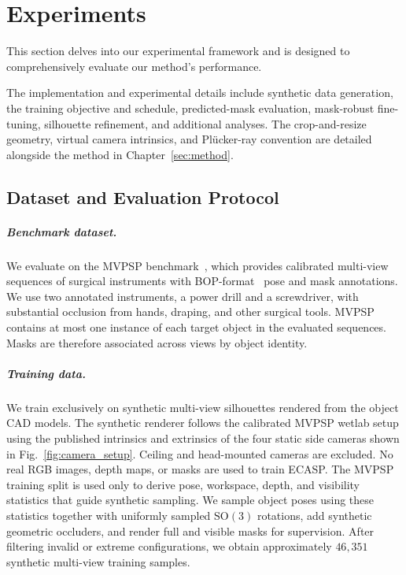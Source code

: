 \chapter{Experiments}
\label{sec:experiments}

This section delves into our experimental framework and is designed to comprehensively evaluate our method's performance.


The implementation and experimental details include synthetic data
generation, the training objective and schedule, predicted-mask evaluation,
mask-robust fine-tuning, silhouette refinement, and additional analyses.
The crop-and-resize geometry, virtual camera intrinsics, and Pl\"ucker-ray
convention are detailed alongside the method in Chapter~\ref{sec:method}.

\section{Dataset and Evaluation Protocol}
\label{sec:dataset}
\paragraph{Benchmark dataset.}
We evaluate on the MVPSP benchmark~\cite{hein2025surgicalnavigation}, which provides calibrated multi-view sequences of surgical instruments with BOP-format~\cite{hodan2018bop} pose and mask annotations.
We use two annotated instruments, a power drill and a screwdriver, with substantial occlusion from hands, draping, and other surgical tools.
MVPSP contains at most one instance of each target object in the evaluated
sequences. Masks are therefore associated across views by object identity.

\paragraph{Training data.}
We train exclusively on synthetic multi-view silhouettes rendered from the object CAD models.
The synthetic renderer follows the calibrated MVPSP wetlab setup using the published intrinsics and extrinsics of the four static side cameras shown in Fig.~\ref{fig:camera_setup}.
Ceiling and head-mounted cameras are excluded.
No real RGB images, depth maps, or masks are used to train ECASP.
The MVPSP training split is used only to derive pose, workspace, depth, and visibility statistics that guide synthetic sampling.
We sample object poses using these statistics together with uniformly sampled \(\mathrm{SO}(3)\) rotations, add synthetic geometric occluders, and render full and visible masks for supervision.
After filtering invalid or extreme configurations, we obtain approximately \(46{,}351\) synthetic multi-view training samples.

